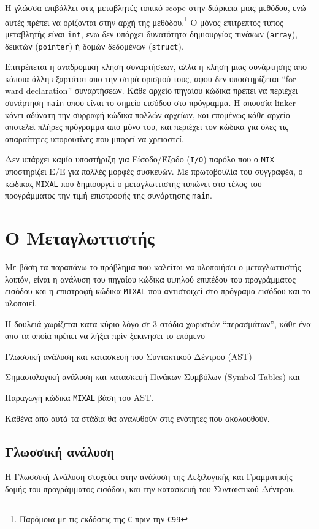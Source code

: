 \documentclass[a4paper,11pt]{article}
\newcommand{\eng}[1]{\foreignlanguage{english}{#1}}
\newcommand{\tech}[1]{\foreignlanguage{english}{\texttt{#1}}}
\begin{document}
Η γλώσσα επιβάλλει στις μεταβλητές τοπικό \eng{scope} στην διάρκεια μιας μεθόδου,
ενώ αυτές πρέπει να ορίζονται στην αρχή της μεθόδου.\footnote{
	Παρόμοια με τις εκδόσεις της \tech{C} πριν την \tech{C99}
} Ο μόνος επιτρεπτός τύπος μεταβλητής είναι \tech{int}, ενω δεν υπάρχει
δυνατότητα δημιουργίας πινάκων (\tech{array}), δεικτών (\tech{pointer}) 
ή δομών δεδομένων (\tech{struct}).

Επιτρέπεται η αναδρομική κλήση συναρτήσεων, αλλα η κλήση μιας
συνάρτησης απο κάποια άλλη εξαρτάται απο την σειρά ορισμού τους, αφου
δεν υποστηρίζεται \enquote{\eng{forward declaration}} συναρτήσεων.
Κάθε αρχείο πηγαίου κώδικα πρέπει να περιέχει συνάρτηση \tech{main}
οπου είναι το σημείο εισόδου στο πρόγραμμα. Η απουσία \eng{linker}
κάνει αδύνατη την συρραφή κώδικα πολλών αρχείων, και επομένως κάθε 
αρχείο αποτελεί πλήρες πρόγραμμα απο μόνο του, και περιέχει τον κώδικα
για όλες τις απαραίτητες υπορουτίνες που μπορεί να χρειαστεί.

Δεν υπάρχει καμία υποστήριξη για Είσοδο/Έξοδο (\tech{I/O}) παρόλο που
ο \tech{MIX} υποστηρίζει Ε/Ε για πολλές μορφές συσκευών. Με πρωτοβουλία 
του συγγραφέα, ο κώδικας \tech{MIXAL} που δημιουργεί ο μεταγλωττιστής
τυπώνει στο τέλος του προγράμματος την τιμή επιστροφής της συνάρτησης \tech{main}.

\section{Ο Μεταγλωττιστής}
Με βάση τα παραπάνω το πρόβλημα που καλείται να υλοποιήσει ο μεταγλωττιστής λοιπόν,
είναι η ανάλυση του πηγαίου κώδικα υψηλού επιπέδου του προγράμματος εισόδου και 
η επιστροφή κώδικα \tech{MIXAL} που αντιστοιχεί στο πρόγραμα εισόδου και το υλοποιεί.

Η δουλειά χωρίζεται κατα κύριο λόγο σε 3 στάδια χωριστών \enquote{περασμάτων},
κάθε ένα απο τα οποία πρέπει να λήξει πρίν ξεκινήσει το επόμενο
\begin{inparaenum}
\item Γλωσσική ανάλυση και κατασκευή του Συντακτικού Δέντρου (\eng{AST})
\item Σημασιολογική ανάλυση και κατασκευή Πινάκων Συμβόλων (\eng{Symbol Tables}) και
\item Παραγωγή κώδικα \tech{MIXAL} βάση του \eng{AST}.
\end{inparaenum}
Καθένα απο αυτά τα στάδια θα αναλυθούν στις ενότητες που ακολουθούν.

\subsection{Γλωσσική ανάλυση}
Η Γλωσσική Ανάλυση στοχεύει στην ανάλυση της Λεξιλογικής και Γραμματικής δομής του
προγράμματος εισόδου, και την κατασκευή του Συντακτικού Δέντρου.
\end{document}
